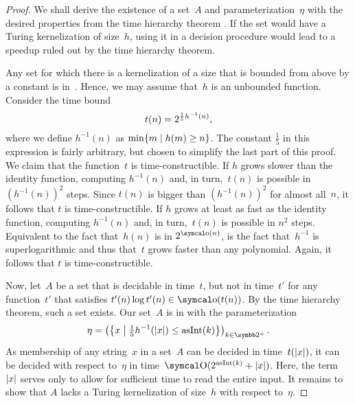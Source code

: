 \begin{proof}
  We shall derive the existence of a set~$A$ and parameterization~$\eta$ with the desired properties from the time hierarchy theorem \parencite{hartmanis1965computational,hennie1966two-tape}.
  If the set would have a Turing kernelization of size~$h$, using it in a decision procedure would lead to a speedup ruled out by the time hierarchy theorem.

  Any set for which there is a kernelization of a size that is bounded from above by a constant is in~.
  Hence, we may assume that~$h$ is an unbounded function.
  Consider the time bound
  \begin{equation*}
    t(n) = 2^{\frac{1}{5} h^{-1}(n)},
  \end{equation*}
  where we define $h^{-1}(n)$ as $\min\{m \;|\; h(m) \ge n\}$.
  The constant $\frac{1}{5}$ in this expression is fairly arbitrary, but chosen to simplify the last part of this proof.
  We claim that the function~$t$ is time-constructible.
  If $h$ grows slower than the identity function, computing $h^{-1}(n)$ and, in turn,~$t(n)$ is possible in $(h^{-1}(n))^2$ steps.
  Since $t(n)$ is bigger than $(h^{-1}(n))^2$ for almost all~$n$, it follows that $t$ is time-constructible.
  If $h$ grows at least as fast as the identity function, computing $h^{-1}(n)$ and, in turn,~$t(n)$ is possible in $n^2$ steps.
  Equivalent to the fact that~$h(n)$ is in $2^{\littleo(n)}$, is the fact that~$h^{-1}$ is superlogarithmic and thus that~$t$ grows faster than any polynomial.
  Again, it follows that $t$ is time-constructible.

  Now, let~$A$ be a set that is decidable in time~$t$, but not in time~$t'$ for any function~$t'$ that satisfies $t'(n) \log t'(n) \in \littleo(t(n))$.
  By the time hierarchy theorem, such a set exists.
  Our set~$A$ is in  with the parameterization
  \begin{equation*}
    \eta \deq \left(\left\{x \st[\middle] \tfrac{1}{5} h^{-1}(\length{x}) \le \asNat(k)\right\}\right)_{k \in \binary^+}.
  \end{equation*}
  As membership of any string~$x$ in a set~$A$ can be decided in time~$t({\lvert x\rvert})$, it can be decided with respect to~$\eta$ in time~$\bigO(2^{\asNat(k)} + \length{x})$.
  Here, the term~${\lvert x\rvert}$ serves only to allow for sufficient time to read the entire input.
  It remains to show that $A$ lacks a Turing kernelization of size~$h$ with respect to~$\eta$.


\end{proof}
